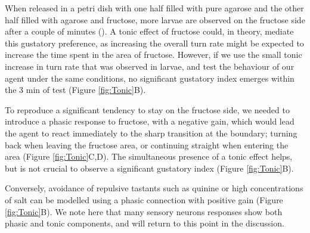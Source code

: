 \documentclass[11pt,a4paper]{article}
\begin{document}
When released in a petri dish with one half filled with pure agarose and the other half filled with agarose and fructose, more larvae are observed on the fructose side after a couple of minutes (\citep{schleyer2011behavior}). A tonic effect of fructose could, in theory, mediate this gustatory preference, as increasing the overall turn rate might be expected to increase the time spent in the area of fructose. However, if we use the small tonic increase in turn rate that was observed in larvae, and test the behaviour of our agent under the same conditions, no significant gustatory index emerges within the 3 min of test (Figure \ref{fig:Tonic}B).

 To reproduce a significant tendency to stay on the fructose side, we needed to introduce a phasic response to fructose, with a negative gain, which would lead the agent to react immediately to the sharp transition at the boundary; turning back when leaving the fructose area, or continuing straight when entering the area (Figure \ref{fig:Tonic}C,D). The simultaneous presence of a tonic effect helps, but is not crucial to observe a significant gustatory index (Figure \ref{fig:Tonic}B).

  Conversely, avoidance of repulsive tastants such as quinine or high concentrations of salt \citep{schleyer2011behavior} can be modelled using a phasic connection with positive gain (Figure \ref{fig:Tonic}B). We note here that many sensory neurons responses show both phasic and tonic components, and will return to this point in the discussion.
\end{document}
